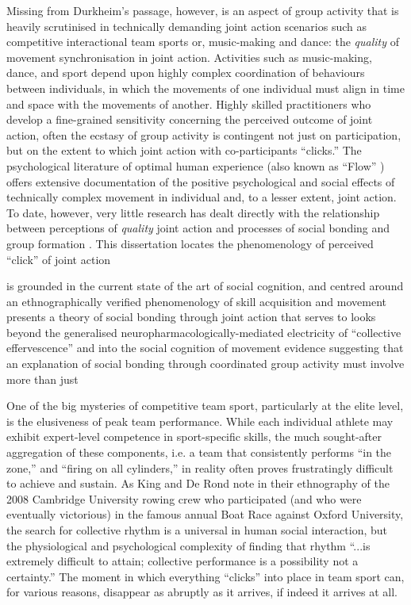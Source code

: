 Missing from Durkheim's passage, however, is an aspect of group activity that is heavily scrutinised in
technically demanding joint action scenarios such as competitive interactional team sports or, music-making and dance: the \textit{quality} of movement synchronisation in joint action.  Activities such as music-making, dance, and sport depend upon highly complex coordination of behaviours between individuals, in which the movements of one individual must align in time and space with the movements of another.  Highly skilled practitioners who develop a fine-grained sensitivity concerning the perceived outcome of joint action, often the ecstasy of group activity is contingent not just on participation, but on the extent to which joint action with co-participants ``clicks.''   The psychological literature of optimal human experience (also known as ``Flow'' \citep{Csikszentmihalyi1992}) offers extensive documentation of the positive psychological and social effects of technically complex movement in individual and, to a lesser extent, joint action. To date, however, very little research has dealt directly with the relationship between perceptions of \textit{quality} joint action and processes of social bonding and group formation \citep[but see][]{Marsh2009}.
This dissertation locates the phenomenology of perceived ``click'' of joint action

is grounded in the current state of the art of social cognition, and centred around
an ethnographically verified phenomenology of skill acquisition and movement
presents a theory of social bonding through joint action that serves to
 looks beyond the generalised neuropharmacologically-mediated electricity of  ``collective effervescence'' and into the social cognition of movement
evidence suggesting that an explanation of social bonding through coordinated group activity must involve more than just



One of the big mysteries of competitive team sport, particularly at the elite level, is the elusiveness of peak team performance.  While each individual athlete may exhibit expert-level competence in sport-specific skills, the much sought-after aggregation of these components, i.e. a team that consistently performs ``in the zone,'' and ``firing on all cylinders,'' in reality often proves frustratingly difficult to achieve and sustain.  As King and De Rond \textcite[568]{King2011} note in their ethnography of the 2008 Cambridge University rowing crew who participated (and who were eventually victorious) in the famous annual Boat Race against Oxford University, the search for collective rhythm is a universal in human social interaction, but  the physiological and psychological complexity of finding that rhythm ``...is extremely difficult to attain; collective performance is a possibility not a certainty.''   The moment in which everything ``clicks'' into place in team sport can, for various reasons, disappear as abruptly as it arrives, if indeed it arrives at all.

